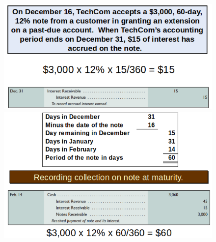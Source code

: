 \documentclass[../main.tex]{subfiles}
\begin{document}
	\begin{figure}[ht!]
		\centering
		\includegraphics[width=.8\columnwidth]{images/c6/interest_adjustments_eg.png}
		\includegraphics[width=.8\columnwidth]{images/c6/interest_collection_eg2.png}
	\end{figure}
	
\end{document}
